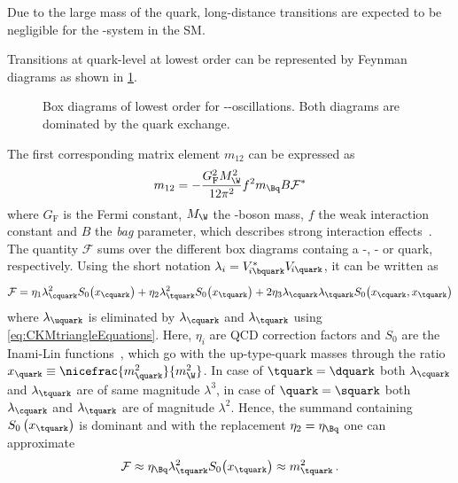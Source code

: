 Due to the large mass of the \bquark quark, long-distance transitions are expected to be negligible for the \Bq-\Bqb system in the \ac{SM}.

Transitions at quark-level at lowest order can be represented by Feynman diagrams as shown in \cref{fig:FeynmanMixing}.
\begin{figure}[tbp]
	\centering
	
	\hspace{0.5cm}
	
	\caption{Box diagrams of lowest order for \Bq-\Bqb{}-oscillations. Both diagrams are dominated by the \tquark quark exchange\cite{Ellis:2016jkw}.}
	\label{fig:FeynmanMixing}
\end{figure}
The first corresponding matrix element $m_{12}$ can be expressed as
\begin{equation}
m_{12}=-\frac{G_{\text{F}}^2M_\W^2}{12\pi^2}f^2m_{\Bq}B\mathcal{F}^\ast \label{eq:monetwo}
\end{equation}
where $G_{\text{F}}$ is the Fermi constant, $M_\W$ the \W-boson mass, $f$ the weak interaction constant and $B$ the \emph{bag} parameter, which describes strong interaction effects~\cite{Branco:396964}.
The quantity $\mathcal{F}$ sums over the different box diagrams containg a \uquark-, \cquark- or \tquark quark, respectively.
Using the short notation $\lambda_i=V^{*}_{{\kern -0.1em}i\bquark}V_{{\kern -0.1em}i\quark}$, it can be written as
\begin{equation}
\mathcal{F}=\eta_1\lambda_\cquark^2S_0\!\left(x_\cquark\right)+\eta_2\lambda_\tquark^2S_0\!\left(x_\tquark\right)
+2\eta_3\lambda_{\cquark}\lambda_{\tquark}S_0\!\left(x_\cquark,x_\tquark\right)
\end{equation}
where $\lambda_\uquark$ is eliminated by $\lambda_\cquark$ and $\lambda_\tquark$ using \cref{eq:CKMtriangleEquations}.
Here, $\eta_i$ are QCD correction factors and $S_0$ are the Inami-Lin functions~\cite{Inami:1980fz}, which go with the up-type-quark masses through the ratio $x_\quark\equiv\nicefrac{m_\quark^2}{m_\W^2}$.
In case of $\tquark=\dquark$ both $\lambda_\cquark$ and $\lambda_\tquark$ are of same magnitude $\lambda^3$, in case of $\quark=\squark$ both $\lambda_\cquark$ and $\lambda_\tquark$ are of magnitude $\lambda^2$.
Hence, the summand containing $S_0\left(x_\tquark\right)$ is dominant and with the replacement $\eta_2=\eta_\Bq$ one can approximate
\begin{equation}
\mathcal{F}\approx\eta_\Bq\lambda_\tquark^2S_0\!\left(x_\tquark\right)\approx m_\tquark^2\,.
\end{equation}

